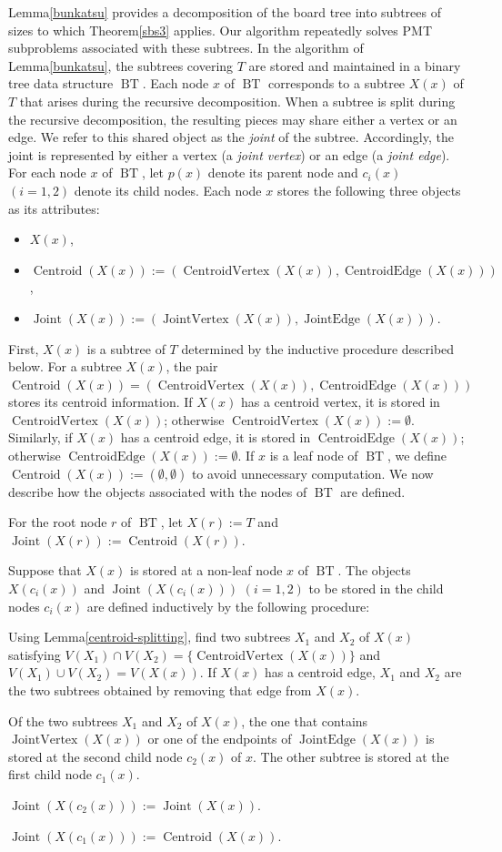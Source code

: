\documentclass[letter,11pt]{article}
\theoremstyle{definition}
\theoremstyle{definition}
\DeclareMathOperator{\BT}{BT}
\DeclareMathOperator{\Cen}{Centroid}
\DeclareMathOperator{\CenE}{CentroidEdge}
\DeclareMathOperator{\CenV}{CentroidVertex}
\DeclareMathOperator{\Joi}{Joint}
\DeclareMathOperator{\JoiV}{JointVertex}
\DeclareMathOperator{\JoiE}{JointEdge}
\newcommand{\1}{\boldmath$~1~$\unboldmath}
\newcommand{\tume}{\hspace*{0.2em}}
\newcommand{\maru}[1]{{\ooalign{\hfill$\small#1$\hfill\crcr\scalebox{1.3}{$\bigcirc$}}}}
\newenvironment{alg-enumerate}{%
  \begin{enumerate}%
   \renewcommand{\theenumi}{\arabic{enumi}}%
   \renewcommand{\labelenumi}{\rm{{\maru{\theenumi}}\tume\/}}%
   \renewcommand{\labelenumii}{\rm{$(${\maru{\theenumi}}-\theenumii$)$\tume\/}}%
 }{\end{enumerate}%
}
\begin{document}
\noindent
Lemma\tume\ref{bunkatsu} provides a decomposition of the board tree
into subtrees of sizes to which Theorem\tume\ref{sbs3} applies.
Our algorithm repeatedly solves PMT subproblems associated with these 
subtrees.
In the algorithm of Lemma\tume\ref{bunkatsu}, the subtrees covering $T$ are
stored and maintained in a binary tree data structure $\BT$.
Each node $x$ of $\BT$ corresponds to a subtree $X(x)$ of $T$ that
arises during the recursive decomposition.
When a subtree is split during the recursive decomposition,
the resulting pieces may share either a vertex or an edge.
We refer to this shared object as the \textit{joint} of the subtree.
Accordingly, the joint is represented by either a vertex
(a \textit{joint vertex}) or an edge (a \textit{joint edge}).
For each node $x$ of $\BT$, let $p(x)$ denote its parent node and
$c_i(x)$ $(i=1,2)$ denote its child nodes.
Each node $x$ stores the following three objects as its attributes:
\begin{itemize}
\item $X(x)$,
\item $\Cen(X(x)) := (\CenV(X(x)), \CenE(X(x)))$,
\item $\Joi(X(x)) := (\JoiV(X(x)), \JoiE(X(x)))$.
\end{itemize}
First, $X(x)$ is a subtree of $T$ determined by the inductive
procedure described below.
For a subtree $X(x)$, the pair
$\Cen(X(x)) = (\CenV(X(x)),\CenE(X(x)))$ stores its centroid
information.
If $X(x)$ has a centroid vertex, it is stored in $\CenV(X(x))$;
otherwise $\CenV(X(x)):=\emptyset$.
Similarly, if $X(x)$ has a centroid edge, it is stored in
$\CenE(X(x))$; otherwise $\CenE(X(x)):=\emptyset$.
If $x$ is a leaf node of $\BT$, we define
$\Cen(X(x)):=(\emptyset,\emptyset)$ to avoid unnecessary computation.
We now describe how the objects associated with the nodes of $\BT$
are defined.
\begin{alg-enumerate}
\item
For the root node $r$ of $\BT$, let
$X(r):=T$ and $\Joi(X(r)):=\Cen(X(r))$.
\item
Suppose that $X(x)$ is stored at a non-leaf node $x$ of $\BT$.
The objects $X(c_i(x))$ and $\Joi(X(c_i(x)))$ $(i=1,2)$ to be stored
in the child nodes $c_i(x)$ are defined inductively by the following
procedure:
\begin{alg-enumerate}
\item
Using Lemma\tume\ref{centroid-splitting}, find two subtrees
$X_1$ and $X_2$ of $X(x)$ satisfying
$V(X_1) \cap V(X_2)=\{\CenV(X(x))\}$ and
$V(X_1) \cup V(X_2)=V(X(x))$.
If $X(x)$ has a centroid edge, $X_1$ and $X_2$ are the two subtrees
obtained by removing that edge from $X(x)$.
\item
Of the two subtrees $X_1$ and $X_2$ of $X(x)$,
the one that contains $\JoiV(X(x))$ or one of the endpoints
of $\JoiE(X(x))$ is stored at the second child node $c_2(x)$ of $x$.
The other subtree is stored at the first child node $c_1(x)$.
\label{No2Child}
\item
$\Joi(X(c_2(x))):=\Joi(X(x))$.
\item
$\Joi(X(c_1(x))):=\Cen(X(x))$.
\end{alg-enumerate}
\end{alg-enumerate}
\end{document}
